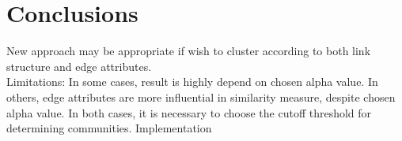 \documentclass{report} %
\begin{document}

\section*{Conclusions}

New approach may be appropriate if wish to cluster according to both link structure and edge attributes.\\

Limitations: In some cases, result is highly depend on chosen alpha value. In others, edge attributes are more influential in similarity measure, despite chosen alpha value. In both cases, it is necessary to choose the cutoff threshold for determining communities.
Implementation



\end{document}
